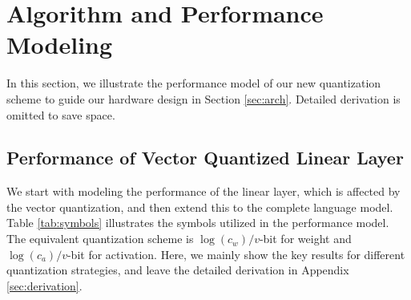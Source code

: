 \documentclass[conference]{IEEEtran}
\begin{document}
\section{Algorithm and Performance Modeling} \label{sec:performance_model}

In this section, we illustrate the performance model of our new quantization scheme to guide our hardware design in Section \ref{sec:arch}. Detailed derivation is omitted to save space.

\subsection{Performance of Vector Quantized Linear Layer}

We start with modeling the performance of the linear layer, which is affected by the vector quantization, and then extend this to the complete language model. Table \ref{tab:symbols} illustrates the symbols utilized in the performance model. The equivalent quantization scheme is $\log(c_w)/v$-bit for weight and $\log(c_a)/v$-bit for activation. Here, we mainly show the key results for different quantization strategies, and leave the detailed derivation in Appendix \ref{sec:derivation}.

\begin{table}[ht]
\centering
\caption{Symbols used in performance modeling of linear layer}
\label{tab:symbols}
\end{table}
\end{document}
